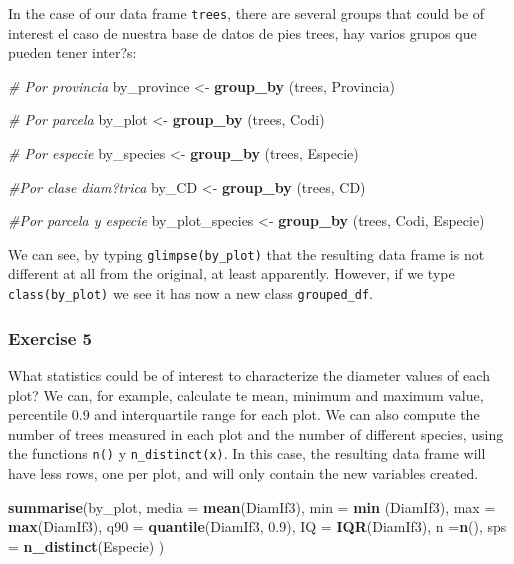 \documentclass[]{article}
\newenvironment{Shaded}{\begin{snugshade}}{\end{snugshade}}
\newcommand{\KeywordTok}[1]{\textcolor[rgb]{0.13,0.29,0.53}{\textbf{#1}}}
\newcommand{\DataTypeTok}[1]{\textcolor[rgb]{0.13,0.29,0.53}{#1}}
\newcommand{\FloatTok}[1]{\textcolor[rgb]{0.00,0.00,0.81}{#1}}
\newcommand{\StringTok}[1]{\textcolor[rgb]{0.31,0.60,0.02}{#1}}
\newcommand{\CommentTok}[1]{\textcolor[rgb]{0.56,0.35,0.01}{\textit{#1}}}
\newcommand{\NormalTok}[1]{#1}
\begin{document}
In the case of our data frame \texttt{trees}, there are several groups
that could be of interest el caso de nuestra base de datos de pies
trees, hay varios grupos que pueden tener inter?s:

\begin{Shaded}
\begin{Highlighting}[]
\CommentTok{# Por provincia}
\NormalTok{by_province <-}\StringTok{ }\KeywordTok{group_by}\NormalTok{ (trees, Provincia)}

\CommentTok{# Por parcela}
\NormalTok{by_plot <-}\StringTok{ }\KeywordTok{group_by}\NormalTok{ (trees, Codi)}

\CommentTok{# Por especie}
\NormalTok{by_species <-}\StringTok{ }\KeywordTok{group_by}\NormalTok{ (trees, Especie)}

\CommentTok{#Por clase diam?trica}
\NormalTok{by_CD <-}\StringTok{ }\KeywordTok{group_by}\NormalTok{ (trees, CD)}

\CommentTok{#Por parcela y especie}
\NormalTok{by_plot_species <-}\StringTok{ }\KeywordTok{group_by}\NormalTok{ (trees, Codi, Especie)}
\end{Highlighting}
\end{Shaded}

We can see, by typing \texttt{glimpse(by\_plot)} that the resulting data
frame is not different at all from the original, at least apparently.
However, if we type \texttt{class(by\_plot)} we see it has now a new
class \texttt{grouped\_df}.

\subsubsection{Exercise 5}\label{exercise-5}

What statistics could be of interest to characterize the diameter values
of each plot? We can, for example, calculate te mean, minimum and
maximum value, percentile 0.9 and interquartile range for each plot. We
can also compute the number of trees measured in each plot and the
number of different species, using the functions \texttt{n()} y
\texttt{n\_distinct(x)}. In this case, the resulting data frame will
have less rows, one per plot, and will only contain the new variables
created.

\begin{Shaded}
\begin{Highlighting}[]
\KeywordTok{summarise}\NormalTok{(by_plot,}
          \DataTypeTok{media =} \KeywordTok{mean}\NormalTok{(DiamIf3),}
          \DataTypeTok{min =} \KeywordTok{min}\NormalTok{ (DiamIf3),}
          \DataTypeTok{max =} \KeywordTok{max}\NormalTok{(DiamIf3),}
          \DataTypeTok{q90 =} \KeywordTok{quantile}\NormalTok{(DiamIf3, }\FloatTok{0.9}\NormalTok{),}
          \DataTypeTok{IQ =} \KeywordTok{IQR}\NormalTok{(DiamIf3),}
          \DataTypeTok{n =}\KeywordTok{n}\NormalTok{(),}
          \DataTypeTok{sps =} \KeywordTok{n_distinct}\NormalTok{(Especie) )}
\end{Highlighting}
\end{Shaded}
\end{document}
